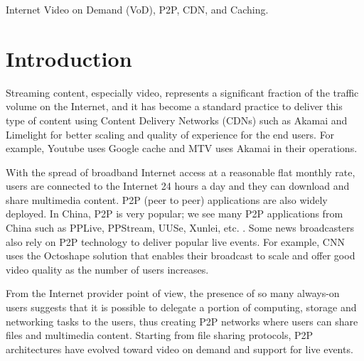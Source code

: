 \documentclass[10pt,final,journal,a4paper]{IEEEtran}
\begin{document}
\begin{IEEEkeywords}
Internet Video on Demand (VoD), P2P, CDN, and Caching.
\end{IEEEkeywords}



\section{Introduction}
Streaming content, especially video, represents a significant fraction of the traffic volume on the Internet, and it has become a standard practice to deliver this type of content using Content Delivery Networks (CDNs) such as Akamai and Limelight for better scaling and quality of experience for the end users. 
For example, Youtube uses Google cache and MTV uses Akamai in their operations.

With the spread of broadband Internet access at a reasonable flat monthly rate, users are connected to the Internet 24 hours a day and they can download and share multimedia content. P2P (peer to peer) applications are also widely deployed. 
In China, P2P is very popular; we see many P2P applications from China such as PPLive, PPStream, UUSe, Xunlei, etc. \cite{Vu:2010:UOC:1865106.1865115}. 
Some news broadcasters also rely on P2P technology to deliver popular live events. 
For example, CNN uses the Octoshape \cite{octoshape} solution that enables their broadcast to scale and offer good video quality as the number of users increases.

From the Internet provider point of view, the presence of so many always-on users suggests that it is possible to delegate a portion of computing, storage and networking tasks to the users, thus creating P2P networks where users can share files and multimedia content. 
Starting from file sharing protocols, P2P architectures have evolved toward video on demand and support for live events.

\end{document}
